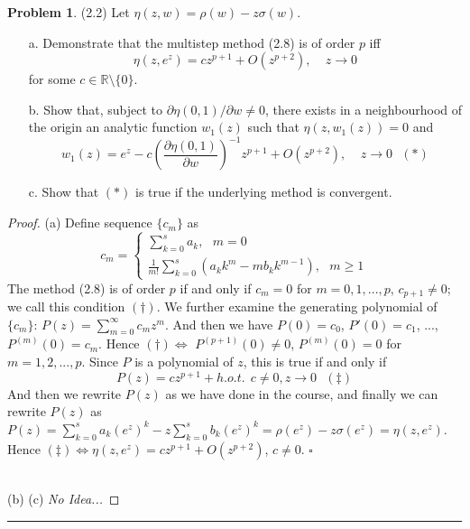 \documentclass[a4paper, 10pt]{article}
\theoremstyle{definition}
\newtheorem{problem}{Problem}
\theoremstyle{hSol}
\begin{document}
\begin{problem} (2.2) Let $\eta(z,w)=\rho(w)-z\sigma(w)$.
\begin{itemize}
  \item[a.] Demonstrate that the multistep method (2.8) is of order $p$ iff
  $$
  \eta(z,e^z)=cz^{p+1} + O(z^{p+2}),~~~~~z\to 0
  $$ 
  for some $c\in \mathbb{R} \setminus \{0\}$.
  \item[b.] Show that, subject to $\partial \eta(0,1)/\partial w \ne 0$, there exists in a neighbourhood of the origin an analytic function $w_1(z)$ such that $\eta(z, w_1(z))=0$ and 
  $$
  w_1(z) = e^z - c\left(\frac{\partial \eta(0,1)}{\partial w}\right)^{-1} z^{p+1} + O(z^{p+2}),~~~~~z\to 0~~~(*)
  $$
  \item[c.] Show that $(*)$ is true if the underlying method is convergent. 
\end{itemize}
\end{problem}
\begin{proof} (a) Define sequence $\{c_m\}$ as
\begin{equation}
  c_m = \begin{cases}
  \sum_{k=0}^s a_k,~~~m=0 \\
  \frac{1}{m!}\sum_{k=0}^s (a_k k^m - mb_k k^{m-1}),~~~m\geq 1
  \end{cases}
\end{equation}
The method (2.8) is of order $p$ if and only if $c_m=0$ for $m=0,1,...,p$, $c_{p+1}\ne 0$; we call this condition $(\dag)$. We further examine the generating polynomial of $\{c_m\}$: $P(z) = \sum_{m=0}^{\infty} c_m z^m$. And then we have $P(0)=c_0$, $P'(0)=c_1$, ..., $P^{(m)}(0)=c_m$. Hence $(\dag) \iff$ $P^{(p+1)}(0)\ne 0$, $P^{(m)}(0)=0$ for $m=1,2,...,p$. Since $P$ is a polynomial of $z$, this is true if and only if
$$
P(z) = cz^{p+1} + h.o.t.~~c\ne0, z\to 0~~~(\ddagger)
$$
And then we rewrite $P(z)$ as we have done in the course, and finally we can rewrite $P(z)$ as $P(z) = \sum_{k=0}^s a_k (e^{z})^k - z\sum_{k=0}^s b_k (e^{z})^k = \rho(e^{z}) - z\sigma(e^{z}) = \eta(z,e^z)$. Hence $(\ddagger) \iff \eta(z,e^z) = cz^{p+1}+O(z^{p+2})$, $c\ne 0$. $\square$

~\\
(b) (c) \emph{No Idea...}
\end{proof}








\noindent\rule{16cm}{0.4pt}
\end{document}
